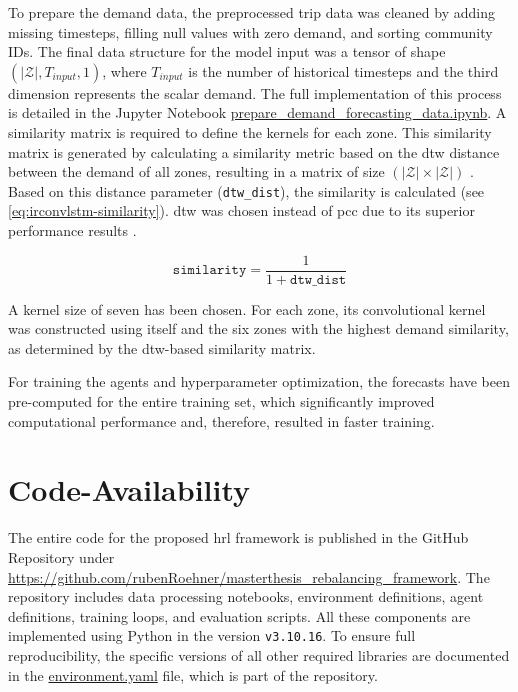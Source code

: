 To prepare the demand data, the preprocessed trip data was cleaned by adding missing timesteps, filling null values with zero demand, and sorting community IDs.
The final data structure for the model input was a tensor of shape $(|\mathcal{Z}|, T_{input}, 1)$, where $T_{input}$ is the number of historical timesteps and the third dimension represents the scalar demand.
The full implementation of this process is detailed in the Jupyter Notebook \url{prepare_demand_forecasting_data.ipynb}.
A similarity matrix is required to define the kernels for each zone.
This similarity matrix is generated by calculating a similarity metric based on the \gls{dtw} distance between the demand of all zones, resulting in a matrix of size $(|\mathcal{Z}| \times |\mathcal{Z}|)$ \cite{li_improving_2023}.
Based on this distance parameter (\texttt{dtw\_dist}), the similarity is calculated (see \autoref{eq:irconvlstm-similarity}).
\gls{dtw} was chosen instead of \gls{pcc} due to its superior performance results \cite{li_improving_2023}.

\begin{equation}\label{eq:irconvlstm-similarity}
    \texttt{similarity} = \frac{1}{1 + \texttt{dtw\_dist}}
\end{equation}

A kernel size of seven has been chosen.
For each zone, its convolutional kernel was constructed using itself and the six zones with the highest demand similarity, as determined by the \gls{dtw}-based similarity matrix.

For training the agents and hyperparameter optimization, the forecasts have been pre-computed for the entire training set, which significantly improved computational performance and, therefore, resulted in faster training.

\section{Code-Availability}\label{sec:implementation-code_availability}
The entire code for the proposed \gls{hrl} framework is published in the GitHub Repository under \url{https://github.com/rubenRoehner/masterthesis_rebalancing_framework}.
The repository includes data processing notebooks, environment definitions, agent definitions, training loops, and evaluation scripts.
All these components are implemented using Python in the version \texttt{v3.10.16}.
To ensure full reproducibility, the specific versions of all other required libraries are documented in the \url{environment.yaml} file, which is part of the repository.